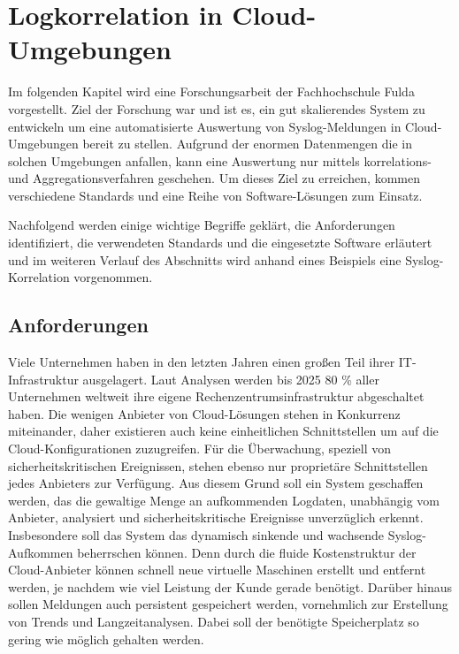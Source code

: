 \chapter{Logkorrelation in Cloud-Umgebungen}\label{02_jcorrelat}
\thispagestyle{fancy}

Im folgenden Kapitel wird eine Forschungsarbeit der Fachhochschule Fulda 
\cite{reissmann} vorgestellt. Ziel der Forschung war und ist es, ein gut skalierendes 
System zu entwickeln um eine automatisierte Auswertung von Syslog-Meldungen in 
Cloud-Umgebungen bereit zu stellen. Aufgrund der enormen Datenmengen die in solchen 
Umgebungen anfallen, kann eine Auswertung nur mittels korrelations- und 
Aggregationsverfahren geschehen. Um dieses Ziel zu erreichen, kommen verschiedene 
Standards und eine Reihe von Software-Lösungen zum Einsatz.

Nachfolgend werden einige wichtige Begriffe geklärt, die Anforderungen identifiziert, die 
verwendeten Standards und die eingesetzte Software erläutert und im weiteren Verlauf des 
Abschnitts wird anhand eines Beispiels eine Syslog-Korrelation vorgenommen.

\section{Anforderungen}\label{anforderungen}

Viele Unternehmen haben in den letzten Jahren einen großen Teil ihrer IT-Infrastruktur 
ausgelagert. Laut Analysen werden bis 2025 80 \% aller Unternehmen \cite{web_ix} 
weltweit ihre eigene Rechenzentrumsinfrastruktur abgeschaltet haben. Die wenigen Anbieter 
von Cloud-Lösungen stehen in Konkurrenz miteinander, daher existieren auch keine 
einheitlichen Schnittstellen um auf die Cloud-Konfigurationen zuzugreifen. Für die 
Überwachung, speziell von sicherheitskritischen Ereignissen, stehen ebenso nur 
proprietäre Schnittstellen jedes Anbieters zur Verfügung. Aus diesem Grund soll ein 
System geschaffen werden, das die gewaltige Menge an aufkommenden Logdaten, unabhängig 
vom Anbieter, analysiert und sicherheitskritische Ereignisse unverzüglich 
erkennt. Insbesondere soll das System das dynamisch sinkende und wachsende 
Syslog-Aufkommen beherrschen können. Denn durch die fluide Kostenstruktur der 
Cloud-Anbieter können schnell neue virtuelle Maschinen erstellt und entfernt werden, je 
nachdem wie viel Leistung der Kunde gerade benötigt.
Darüber hinaus sollen Meldungen auch persistent gespeichert werden, vornehmlich zur 
Erstellung von Trends und Langzeitanalysen. Dabei soll der benötigte Speicherplatz so 
gering wie möglich gehalten werden.

